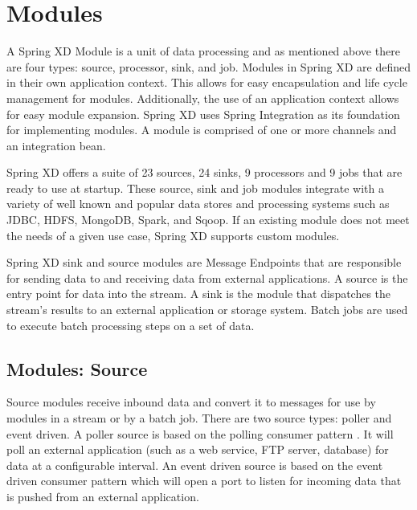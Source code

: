 \section{Modules}
\label{sec:Modules}
A Spring XD Module \cite{modules} is a unit of data processing and as mentioned above 
there are four types: source, processor, sink, and job. Modules in Spring XD are defined 
in their own application context. This allows for easy encapsulation and life cycle 
management for modules. Additionally, the use of an application context allows for easy 
module expansion.  Spring XD uses Spring Integration \cite{spring-integration-reference} 
as its foundation for implementing modules. A module is comprised of one or more channels 
and an integration bean.

\par

Spring XD offers a suite of 23 sources, 24 sinks, 9 processors and 9 jobs that are ready 
to use at startup.  These source, sink and job modules integrate with a variety of well 
known and popular data stores and processing systems such as JDBC, HDFS, MongoDB, Spark, 
and Sqoop.  If an existing module does not meet the needs of a given use case, Spring XD 
supports custom modules.

Spring XD sink and source modules are Message Endpoints 
\cite{enterprise-integration-pattern-message-endpoint} 
that are responsible for sending data to and receiving data from external applications.
A source is the entry point for data into the stream. A sink is the module that dispatches
the stream's results to an external application or storage system. Batch jobs are used to
execute batch processing steps on a set of data.

\par

\subsection{Modules: Source}
Source modules receive inbound data and convert it to messages for
use by modules in a stream or by a batch job.
There are two source types: poller and event driven.  A poller source is based on the polling
consumer pattern \cite{enterprise-integration-pattern-pollingconsumer}. It
will poll an external application (such as a web service, FTP server, database) for data at a
configurable interval. An event driven source is based on the event driven
consumer pattern \cite{enterprise-integration-pattern-eventdrivenconsumer} which will
open a port to listen for incoming data that is pushed from an external application.

